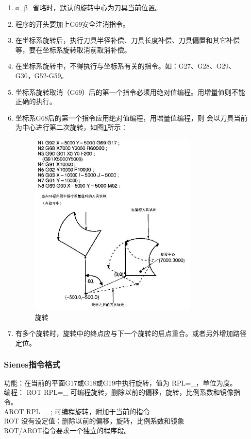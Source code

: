 \begin{enumerate}[A、]
	\item α\_β\_省略时，默认的旋转中心为刀具当前位置。
\item 程序的开头要加上G69安全注消指令。
\item 在坐标系旋转后，执行刀具半径补偿、刀具长度补偿、刀具偏置和其它补偿等，要在坐标系旋转取消前取消补偿。
\item 在坐标系旋转中，不得执行与坐标系有关的指令。如：G27、G28、G29、G30，G52-G59。
\item  坐标系旋转取消（G69）后的第一个指令必须用绝对值编程。用增量值则不能正确的执行。
\item 坐标系G68后的第一个指令应用绝对值编程，用增量值编程，则    会以刀具当前为中心进行第二次旋转，如图\ref{旋转}所示：
\begin{figure}[!hbtp]
	\centering	\includegraphics[width=0.8\textwidth]{images/7-1}
	\caption{旋转} \label{旋转}
\end{figure}
\item 有多个旋转时，旋转中的终点应与下一个旋转的启点重合。或者另外增加路径定位。
\end{enumerate}
\subsubsection{Sienes指令格式}
功能：在当前的平面G17或G18或G19中执行旋转，值为 RPL=\_，单位为度。\\
编程：    ROT RPL=\_  可编程旋转，删除以前的偏移，旋转，比例系数和镜像指令。\\
AROT RPL=\_; 可编程旋转，附加于当前的指令\\
ROT    没有设定值：删除以前的偏移，旋转，比例系数和镜象\\
ROT/AROT指令要求一个独立的程序段。

